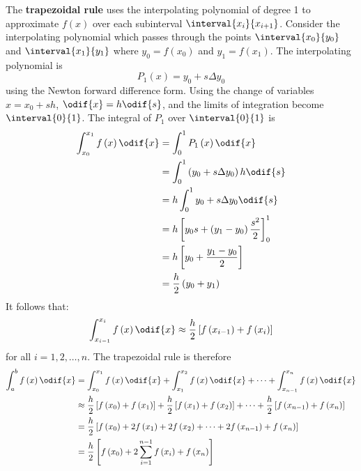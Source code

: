 \documentclass{article}
\begin{document}
The \textbf{trapezoidal rule} uses the interpolating polynomial of degree 1 to approximate \(f\left( x \right)\) over each subinterval \(\interval{x_i}{x_{i + 1}}\).
Consider the interpolating polynomial which passes through the points \(\interval{x_0}{y_0}\) and \(\interval{x_1}{y_1}\) where
\(y_0 = f\left( x_0 \right)\) and \(y_1 = f\left( x_1 \right)\). The interpolating polynomial is
\begin{equation*}
    P_1\left( x \right) = y_0 + s \Delta{y_0}
\end{equation*}
using the Newton forward difference form. Using the change of variables \(x = x_0 + s h\), \(\odif{x} = h \odif{s}\), and the limits of integration become \(\interval{0}{1}\).
The integral of \(P_1\) over \(\interval{0}{1}\) is
\begin{align*}
    \int_{x_0}^{x_1} f\left( x \right) \odif{x} & = \int_0^1 P_1\left( x \right) \odif{x}                               \\
                                                & = \int_0^1 \left( y_0 + s \Delta{y_0} \right) h \odif{s}              \\
                                                & = h \int_0^1 y_0 + s \Delta{y_0} \odif{s}                             \\
                                                & = h \left[ y_0 s + \left( y_1 - y_0 \right) \frac{s^2}{2} \right]_0^1 \\
                                                & = h \left[ y_0 + \frac{y_1 - y_0}{2} \right]                          \\
                                                & = \frac{h}{2} \left( y_0 + y_1 \right)
\end{align*}
It follows that:
\begin{equation*}
    \int_{x_{i - 1}}^{x_i} f\left( x \right) \odif{x} \approx \frac{h}{2} \left[ f\left( x_{i - 1} \right) + f\left( x_i \right) \right]
\end{equation*}
for all \(i = 1, 2, \ldots, n\). The trapezoidal rule is therefore
\begin{align*}
    \int_a^b f\left( x \right) \odif{x} & = \int_{x_0}^{x_1} f\left( x \right) \odif{x} + \int_{x_1}^{x_2} f\left( x \right) \odif{x} + \cdots + \int_{x_{n - 1}}^{x_n} f\left( x \right) \odif{x}                                                                                  \\
                                        & \approx \frac{h}{2} \left[ f\left( x_0 \right) + f\left( x_1 \right) \right] + \frac{h}{2} \left[ f\left( x_1 \right) + f\left( x_2 \right) \right] + \cdots + \frac{h}{2} \left[ f\left( x_{n - 1} \right) + f\left( x_n \right) \right] \\
                                        & = \frac{h}{2} \left[ f\left( x_0 \right) + 2 f\left( x_1 \right) + 2 f\left( x_2 \right) + \cdots + 2 f\left( x_{n - 1} \right) + f\left( x_n \right) \right]                                                                             \\
                                        & = \frac{h}{2} \left[ f\left( x_0 \right) + 2 \sum_{i = 1}^{n - 1} f\left( x_i \right) + f\left( x_n \right) \right]
\end{align*}
\end{document}
